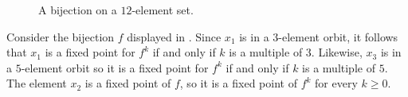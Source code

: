 \begin{figure}[t]
  \caption[A bijection on a $12$-element set]{A bijection on a $12$-element set.}
  \label{figure:orbits-fixed-points-12-element-set}
\end{figure}

\begin{example}
  Consider the bijection $f$ displayed in . Since $x_1$ is in a $3$-element orbit, it follows that $x_1$ is a fixed point for $f^k$ if and only if $k$ is a multiple of $3$. Likewise, $x_3$ is in a $5$-element orbit so it is a fixed point for $f^k$ if and only if $k$ is a multiple of $5$. The element $x_2$ is a fixed point of $f$, so it is a fixed point of $f^k$ for every $k\geq 0$.


\end{example}
